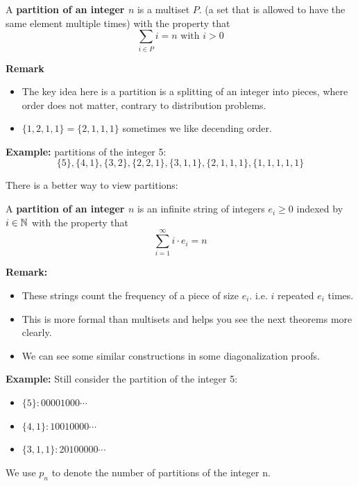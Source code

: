 \begin{definition}
    A \textbf{partition of an integer $n$} is a multiset $P$. 
    (a set that is allowed to have the same element multiple times) 
    with the property that $$\sum_{i \in P}i=n \text{ with } i>0$$
\end{definition}
\textbf{Remark}
\begin{itemize}
    \item The key idea here is a partition is a splitting of an integer into pieces, 
    where order does not matter, contrary to distribution problems.
    \item $\{1,2,1,1\}=\{2,1,1,1\}$ sometimes we like decending order.
\end{itemize}
\textbf{Example:} partitions of the integer 5:
$$\{5\},\{4,1\},\{3,2\},\{2,2,1\},\{3,1,1\},\{2,1,1,1\},\{1,1,1,1,1\}$$

There is a better way to view partitions:
\begin{definition}
    A \textbf{partition of an integer $n$} is an infinite string of integers $e_i \geq 0$ 
    indexed by $i \in \mathbb{N}$ with the property that $$\sum_{i=1}^{\infty}i \cdot e_i=n$$
\end{definition}
\textbf{Remark:}
\begin{itemize}
    \item These strings count the frequency of a piece of size $e_i$. i.e. $i$ repeated $e_i$ times.
    \item This is more formal than multisets and helps you see the next theorems more clearly.
    \item We can see some similar constructions in some diagonalization proofs.
\end{itemize}
\textbf{Example:} Still consider the partition of the integer 5:
\begin{itemize}
    \item $\{5\}: 00001000 \cdots $
    \item $\{4,1\}: 10010000 \cdots $
    \item $\{3,1,1\}: 20100000 \cdots $
\end{itemize}

\begin{definition}
    We use $p_n$ to denote the number of partitions of the integer n.
\end{definition}

